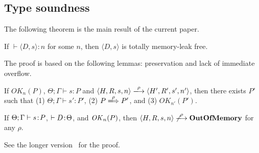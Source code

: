 \subsection{Type soundness}


The following theorem is the main result of the current paper. 

\begin{theorem}\label{thm1}
If $\vdash \langle D, s \rangle : n$ for some \(n\), then \(\langle D,
s \rangle\) is totally memory-leak free.
\end{theorem}


The proof is based on the following lemmas: preservation and lack of
immediate overflow.

\begin{lemma}[Preservation]
\label{lem:preservation}
If $OK_{n}(P)$, $\Theta; \Gamma \vdash s : P$ and $\langle H,R,s,n
\rangle \xlongrightarrow{\rho} \langle H',R',s', n' \rangle$, then
there exists $P'$ such that (1) $ \Theta; \Gamma \vdash s' : P'$, (2)
\(P \xLongrightarrow{\rho} P'\), and (3) \(OK_{n'}(P')\).
\end{lemma}


\begin{lemma}
\label{lem:immediateSafety}
If $\Theta; \Gamma \vdash s \!:\! P$, \(\vdash D \!:\! \Theta\), and
\(\mathit{OK}_n(P)\), then $\langle H, R, s, n \rangle
\not\xlongrightarrow{\rho} \OVERFLOW$ for any \(\rho\).
\end{lemma}

See the longer version~\cite{longversion} for the proof.
